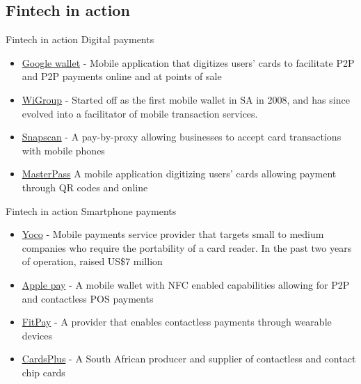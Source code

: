 \documentclass[11pt]{beamer}
\begin{document}

\subsection{Fintech in action}

\begin{frame}{Fintech in action}
	Digital payments
	\begin{itemize}
		\item \href{https://www.google.com/wallet/}{Google wallet} - Mobile application that digitizes users' cards to facilitate P2P and P2P payments online and at points of sale
		\item \href{www.wigroupinternational.com}{WiGroup} - Started off as the first mobile wallet in SA in 2008, and has since evolved into a facilitator of mobile transaction services.
		\item \href{http://www.snapscan.co.za}{Snapscan} - A pay-by-proxy allowing businesses to accept card transactions with mobile phones
		\item \href{https://masterpass.com}{MasterPass} A mobile application digitizing users' cards allowing payment through QR codes and online
	\end{itemize}
\end{frame}



\begin{frame}{Fintech in action}
	Smartphone payments
	\begin{itemize}
		\item \href{https://www.yoco.co.za/}{Yoco} - Mobile payments service provider that targets small to medium companies who require the portability of a card reader. In the past two years of operation, raised US\$7 million
		\item \href{https://www.apple.com/apple-pay/}{Apple pay} - A mobile wallet with NFC enabled capabilities allowing for P2P and contactless POS payments
		\item \href{http://www.fit-pay.com}{FitPay} - A provider that enables contactless payments through wearable devices
		\item \href{http://cardsplus.co.za}{CardsPlus} - A South African producer and supplier of contactless and contact chip cards
	\end{itemize}
\end{frame}
\end{document}
